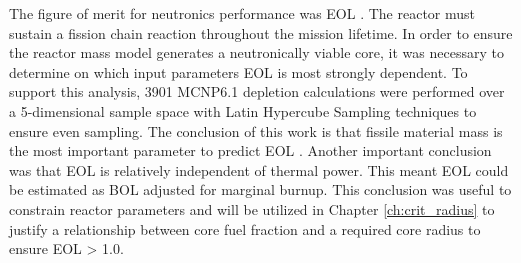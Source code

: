 The figure of merit for neutronics performance was EOL \keff. The reactor must
sustain a fission chain reaction throughout the mission lifetime. In order to
ensure the reactor mass model generates a neutronically viable core, it was
necessary to determine on which input parameters EOL \keff is most strongly
dependent. To support this analysis, 3901 MCNP6.1 depletion calculations were
performed over a 5-dimensional sample space with Latin Hypercube Sampling
techniques to ensure even sampling. The conclusion of this work is that fissile
material mass is the most important parameter to predict EOL \keff. Another
important conclusion was that EOL \keff is relatively independent of thermal power. This
meant EOL \keff could be estimated as BOL \keff adjusted for marginal burnup.
This conclusion was useful to constrain reactor parameters and will be utilized
in Chapter \ref{ch:crit_radius} to justify a relationship between core fuel fraction
and a required core radius to ensure EOL \keff > 1.0.
